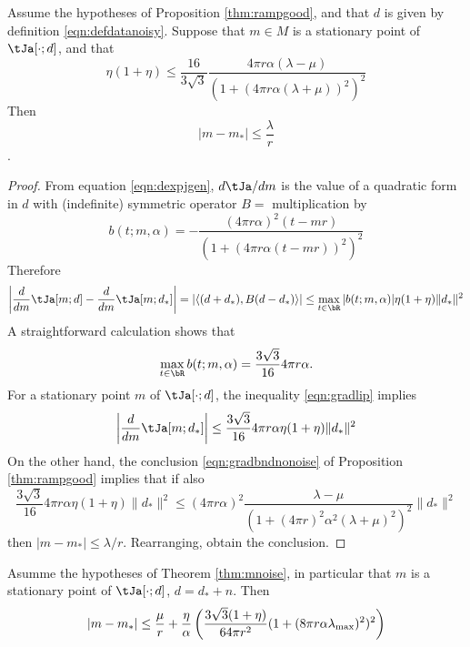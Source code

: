 \begin{proposition}
  \label{thm:mnoise}
  Assume the hypotheses of Proposition \ref{thm:rampgood}, and that $d$ is
  given by definition \ref{eqn:defdatanoisy}. Suppose that $m \in M$
  is a stationary point of $\tJa[\cdot;d]$, and that
  \begin{equation}
    \label{eqn:mnoisebnd}
    \eta(1+\eta) \le \frac{16}{3\sqrt{3}}\frac{4\pi r \alpha
      (\lambda-\mu)}{(1+(4\pi r\alpha(\lambda+\mu))^2)^2}
  \end{equation}
  Then
  \begin{equation}
    \label{eqn:mnoisebndfin}
    |m-m_*| \le \frac{\lambda}{r}
  \end{equation}.
\end{proposition}

\begin{proof}
  From equation \ref{eqn:dexpjgen}, $d \tJa / dm$ is the
value of a quadratic form in $d$ with (indefinite) symmetric operator
$B = $ multiplication by
\[
  b(t;m,\alpha)  = -\frac{(4 \pi r \alpha)^2 (t-mr)}{(1+(4\pi r \alpha (t-mr))^2)^{2}}
\]
Therefore
\begin{equation}
  \label{eqn:gradlip}
  \left|\frac{d}{dm}\tJa[m;d]-\frac{d}{dm}\tJa[m;d_*]\right| =
  |\langle (d+d_*),B(d-d_*)\rangle| \le \max_{t \in
    \bR}|b(t;m,\alpha)|\eta(1+\eta)\|d_*\|^2
\end{equation}
A straightforward calculation shows that
\[
  \max_{t \in \bR} b(t;m,\alpha) = \frac{3\sqrt{3}}{16} 4\pi r\alpha.
\]
For a stationary point $m$ of
$\tJa[\cdot;d]$, the inequality \ref{eqn:gradlip} implies
\[
  \left|\frac{d}{dm}\tJa[m;d_*]\right| \le \frac{3\sqrt{3}}{16} 4\pi
  r\alpha \eta(1+\eta)\|d_*\|^2
\]
On the other hand, the conclusion \ref{eqn:gradbndnonoise} of Proposition
\ref{thm:rampgood} implies that if also
\[
  \frac{3\sqrt{3}}{16} 4\pi r\alpha \eta(1+\eta)\|d_*\|^2 \le (4 \pi r
  \alpha)^2 \frac{\lambda-\mu}{(1+(4\pi r)^2\alpha^2
    (\lambda+\mu)^2)^{2}} \|d_*\|^2
\]
then $|m-m_*|\le \lambda/r$. Rearranging, obtain the conclusion.
\end{proof}

\begin{corollary}
  \label{thm:mnoisecor}
  Asumme the hypotheses of Theorem \ref{thm:mnoise}, in particular
  that $m$ is a stationary point of $\tJa[\cdot;d]$, $d=d_*+n$. Then
  \begin{equation}
    \label{eqn:mnoisecor}
    |m-m_*| \le \frac{\mu}{r} + \frac{\eta}{\alpha} \left(\frac{3\sqrt{3}(1+\eta)}{64\pi r^2}(1+(8\pi r \alpha
      \lambda_{\rm max})^2)^2\right)
  \end{equation}
\end{corollary}

